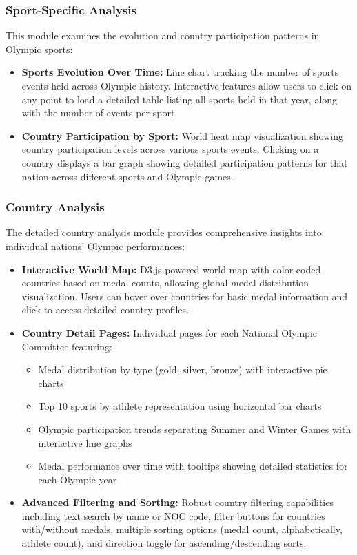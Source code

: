 \documentclass[a4paper, 12pt]{article}
\begin{document}
\subsubsection{Sport-Specific Analysis}
This module examines the evolution and country participation patterns in Olympic sports:

\begin{itemize}[leftmargin=*]
    \item \textbf{Sports Evolution Over Time:} Line chart tracking the number of sports events held across Olympic history. Interactive features allow users to click on any point to load a detailed table listing all sports held in that year, along with the number of events per sport.
    
    \item \textbf{Country Participation by Sport:} World heat map visualization showing country participation levels across various sports events. Clicking on a country displays a bar graph showing detailed participation patterns for that nation across different sports and Olympic games.
\end{itemize}

\subsubsection{Country Analysis}
The detailed country analysis module provides comprehensive insights into individual nations' Olympic performances:

\begin{itemize}[leftmargin=*]
    \item \textbf{Interactive World Map:} D3.js-powered world map with color-coded countries based on medal counts, allowing global medal distribution visualization. Users can hover over countries for basic medal information and click to access detailed country profiles.
    
    \item \textbf{Country Detail Pages:} Individual pages for each National Olympic Committee featuring:
    \begin{itemize}
        \item Medal distribution by type (gold, silver, bronze) with interactive pie charts
        \item Top 10 sports by athlete representation using horizontal bar charts
        \item Olympic participation trends separating Summer and Winter Games with interactive line graphs
        \item Medal performance over time with tooltips showing detailed statistics for each Olympic year
    \end{itemize}
    
    \item \textbf{Advanced Filtering and Sorting:} Robust country filtering capabilities including text search by name or NOC code, filter buttons for countries with/without medals, multiple sorting options (medal count, alphabetically, athlete count), and direction toggle for ascending/descending sorts.
\end{itemize}
\end{document}
